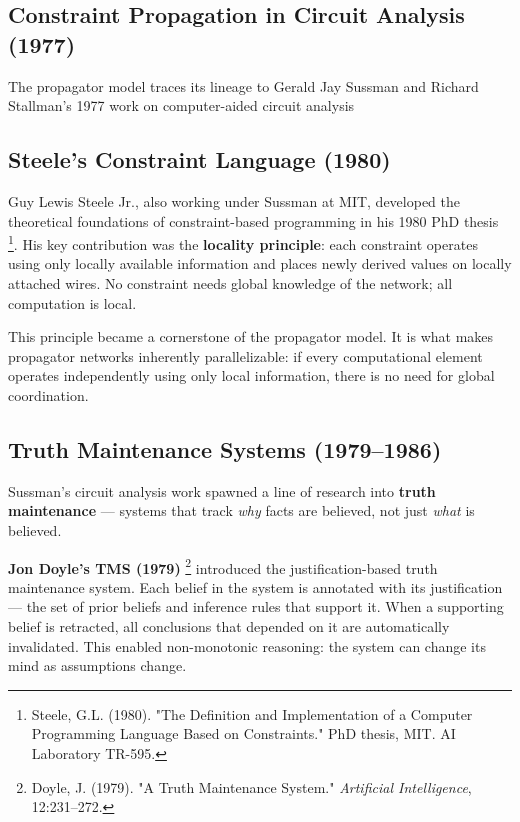 \documentclass[11pt]{article}
\begin{document}
\subsection{Constraint Propagation in Circuit Analysis (1977)}
\label{sec:org6eeffdb}

The propagator model traces its lineage to Gerald Jay Sussman and
Richard Stallman's 1977 work on computer-aided circuit analysis
\subsection{Steele's Constraint Language (1980)}
\label{sec:org9b00a1c}

Guy Lewis Steele Jr., also working under Sussman at MIT, developed the
theoretical foundations of constraint-based programming in his 1980 PhD
thesis \footnote{Steele, G.L. (1980). "The Definition and
Implementation of a Computer Programming Language Based on
Constraints." PhD thesis, MIT. AI Laboratory TR-595.}. His key contribution was the \textbf{locality
principle}: each constraint operates using only locally available
information and places newly derived values on locally attached wires.
No constraint needs global knowledge of the network; all computation is
local.

This principle became a cornerstone of the propagator model. It is what
makes propagator networks inherently parallelizable: if every
computational element operates independently using only local
information, there is no need for global coordination.
\subsection{Truth Maintenance Systems (1979--1986)}
\label{sec:orgd9c48ee}

Sussman's circuit analysis work spawned a line of research into \textbf{truth
maintenance} --- systems that track \emph{why} facts are believed, not just
\emph{what} is believed.

\textbf{Jon Doyle's TMS (1979)} \footnote{Doyle, J. (1979). "A Truth Maintenance System."
\emph{Artificial Intelligence}, 12:231--272.} introduced the
justification-based truth maintenance system. Each belief in the system
is annotated with its justification --- the set of prior beliefs and
inference rules that support it. When a supporting belief is retracted,
all conclusions that depended on it are automatically invalidated. This
enabled non-monotonic reasoning: the system can change its mind as
assumptions change.
\end{document}
